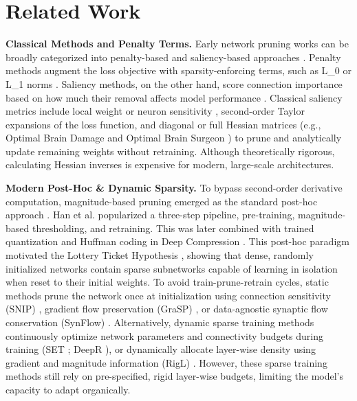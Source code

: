 \section{Related Work}
\textbf{Classical Methods and Penalty Terms.} Early network pruning works can be 
broadly categorized into penalty-based and saliency-based approaches \cite{reed1993pruning}. 
Penalty methods augment the loss objective with sparsity-enforcing terms, such as 
L\_0 or L\_1 norms \cite{chauvin1989backpropagation, janowsky1989pruning, weigend1991generalization}. 
Saliency methods, on the other hand, score connection importance based on how much 
their removal affects model performance \cite{lecun1989optimal}. Classical saliency 
metrics include local weight or neuron sensitivity \cite{mozer1989using, karnin1990simple}, 
second-order Taylor expansions of the loss function, and diagonal or full Hessian 
matrices (e.g., Optimal Brain Damage \cite{lecun1989optimal} and Optimal Brain Surgeon \cite{hassibi1993second}) 
to prune and analytically update remaining weights without retraining. Although theoretically rigorous, calculating Hessian inverses is expensive for modern, large-scale architectures.

\textbf{Modern Post-Hoc & Dynamic Sparsity.} To bypass second-order derivative computation, magnitude-based pruning emerged as the standard post-hoc approach \cite{thimm1995evaluating, strom1997sparse}.
Han et al. \cite{han2015learning} popularized a three-step pipeline, pre-training, 
magnitude-based thresholding, and retraining. This was later combined with trained 
quantization and Huffman coding in Deep Compression \cite{han2016deep}. This post-hoc 
paradigm motivated the Lottery Ticket Hypothesis \cite{frankle2019lottery}, showing 
that dense, randomly initialized networks contain sparse subnetworks capable of 
learning in isolation when reset to their initial weights. To avoid train-prune-retrain cycles, static methods prune the network once at 
initialization using connection sensitivity (SNIP) \cite{lee2019snip}, gradient 
flow preservation (GraSP) \cite{wang2020grasp}, or data-agnostic synaptic flow 
conservation (SynFlow) \cite{tanaka2020pruning}. Alternatively, dynamic sparse 
training methods continuously optimize network parameters and connectivity budgets 
during training (SET \cite{mocanu2018scalable}; DeepR \cite{bellec2018deep}), or dynamically 
allocate layer-wise density using gradient and magnitude information (RigL) \cite{evci2020rigging}. 
However, these sparse training methods still rely on pre-specified, rigid layer-wise 
budgets, limiting the model's capacity to adapt organically.

